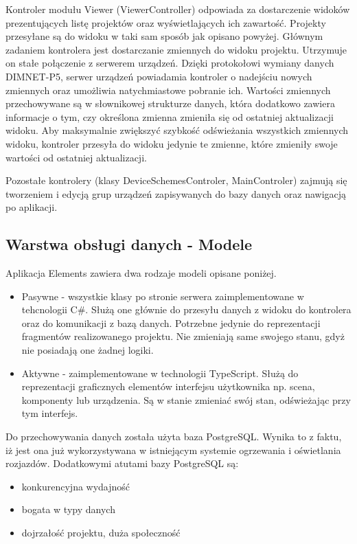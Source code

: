 Kontroler modułu Viewer (ViewerController) odpowiada za dostarczenie widoków prezentujących listę projektów oraz wyświetlających ich zawartość. Projekty przesyłane są do widoku w taki sam sposób jak opisano powyżej. Głównym zadaniem kontrolera jest dostarczanie zmiennych do widoku projektu. Utrzymuje on stałe połączenie z serwerem urządzeń. Dzięki protokołowi wymiany danych DIMNET-P5, serwer urządzeń powiadamia kontroler o nadejściu nowych zmiennych oraz umożliwia natychmiastowe pobranie ich. Wartości zmiennych przechowywane są w słownikowej strukturze danych, która dodatkowo zawiera informacje o tym, czy określona zmienna zmieniła się od ostatniej aktualizacji widoku. Aby maksymalnie zwiększyć szybkość odświeżania wszystkich zmiennych widoku, kontroler przesyła do widoku jedynie te zmienne, które zmieniły swoje wartości od ostatniej aktualizacji.

Pozostałe kontrolery (klasy DeviceSchemesControler, MainControler) zajmują się tworzeniem i edycją grup urządzeń zapisywanych do bazy danych oraz nawigacją po aplikacji.

\subsection{Warstwa obsługi danych - Modele}
Aplikacja Elements zawiera dwa rodzaje modeli opisane poniżej.
\begin{itemize}
\item Pasywne - wszystkie klasy po stronie serwera zaimplementowane w tehcnologii C\#. Służą one głównie do przesyłu danych z widoku do kontrolera oraz do komunikacji z bazą danych. Potrzebne jedynie do reprezentacji fragmentów realizowanego projektu. Nie zmieniają same swojego stanu, gdyż nie posiadają one żadnej logiki. 
\item Aktywne - zaimplementowane w technologii TypeScript. Służą do reprezentacji graficznych elementów interfejsu użytkownika np. scena, komponenty lub urządzenia. Są w stanie zmieniać swój stan, odświeżając przy tym interfejs.
\end{itemize}

Do przechowywania danych została użyta baza PostgreSQL. Wynika to z faktu, iż jest ona już wykorzystywana w istniejącym systemie ogrzewania i oświetlania rozjazdów. Dodatkowymi atutami bazy PostgreSQL są: \cite{postgresql-book}
\begin{itemize}
\item konkurencyjna wydajność
\item bogata w typy danych
\item dojrzałość projektu, duża społeczność
\end{itemize}

